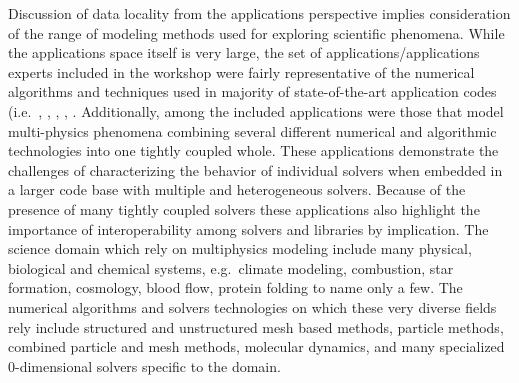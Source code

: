 %
%
$ $\\
\noindent
Discussion of data locality from the applications perspective implies
consideration of the range of modeling methods used for exploring
scientific phenomena. While the  
applications space itself is very large, the set of
applications/applications experts included in the workshop were fairly 
representative of the numerical algorithms and techniques used in
majority of state-of-the-art application codes (i.e.\ \cite{cosmo},
\cite{gromacs}, \cite{Hydra, op2}, \cite{chombo}, \cite{vis}.
Additionally, among the included applications were those that model
multi-physics phenomena combining several different numerical and
algorithmic technologies into one tightly coupled whole. These
applications demonstrate the challenges of characterizing the behavior
of individual solvers when embedded in a larger code base with
multiple and heterogeneous solvers.  Because of the presence of many
tightly coupled solvers these applications also
highlight the importance of interoperability among solvers and
libraries by implication. The science domain which rely on multiphysics modeling
include many physical, biological and chemical systems, e.g.\ climate
modeling, combustion, star formation, cosmology, blood flow, protein
folding to name only a few. The numerical algorithms and solvers
technologies on which these very diverse fields rely include
structured and unstructured mesh based methods, particle methods,
combined particle and mesh methods, molecular dynamics,  and many
specialized 0-dimensional solvers specific to the domain. 

